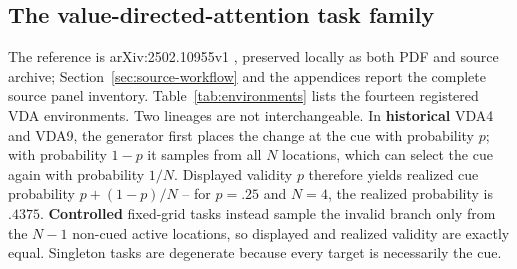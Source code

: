 \documentclass[11pt,a4paper]{article}
\begin{document}
\subsection{The value-directed-attention task family}\label{sec:task-family}
The reference is arXiv:2502.10955v1 \citep{mah2025}, preserved locally as both PDF and source archive; Section~\ref{sec:source-workflow} and the appendices report the complete source panel inventory. Table~\ref{tab:environments} lists the fourteen registered VDA environments. Two lineages are not interchangeable. In \textbf{historical} VDA4 and VDA9, the generator first places the change at the cue with probability $p$; with probability $1-p$ it samples from all $N$ locations, which can select the cue again with probability $1/N$. Displayed validity $p$ therefore yields realized cue probability $p+(1-p)/N$ -- for $p=.25$ and $N=4$, the realized probability is $.4375$. \textbf{Controlled} fixed-grid tasks instead sample the invalid branch only from the $N-1$ non-cued active locations, so displayed and realized validity are exactly equal. Singleton tasks are degenerate because every target is necessarily the cue.
\end{document}
